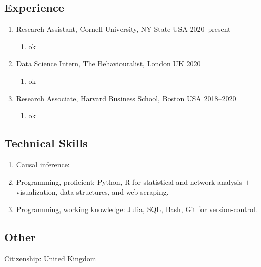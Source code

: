 \documentclass[letterpaper,11pt,oneside]{article}
\begin{document}
\subsection*{Experience}
\begin{enumerate}[itemsep=2.5pt, label={}, leftmargin=0pt]
    \item Research Assistant, Cornell University, NY State USA \hfill 2020--present
    \begin{enumerate}[itemsep=0pt, label={\textbf{--}}, leftmargin=12pt]
        \item ok
    \end{enumerate}

    \item Data Science Intern, The Behaviouralist, London UK \hfill 2020
    \begin{enumerate}[itemsep=0pt, label={\textbf{--}}, leftmargin=12pt]
        \item ok
    \end{enumerate}
    
    \item Research Associate, Harvard Business School, Boston USA \hfill 2018--2020
    \begin{enumerate}[itemsep=0pt, label={\textbf{--}}, leftmargin=12pt]
        \item ok
    \end{enumerate}
\end{enumerate}
    
\subsection*{Technical Skills}
\begin{enumerate}[itemsep=0pt, label={\textbf{--}}, leftmargin=12pt]
    \item Causal inference:
    \item Programming, proficient: Python, R for statistical and network analysis $+$ visualization, data structures, and web-scraping.
    \item Programming, working knowledge: Julia, SQL, Bash, Git for version-control.
\end{enumerate}


\vfill
\subsection*{Other}
    Citizenship: United Kingdom %
    
\end{document}
